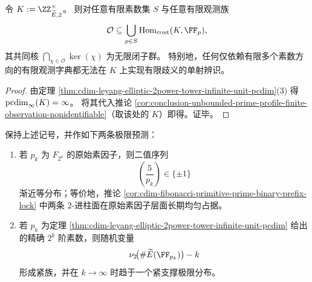 \begin{corollary}[二幂椭圆塔单位群在有限素数观测下不可辨识]\label{cor:cdim-elliptic-2power-tower-finite-prime-observation-indistinguishable}
令 \(K:=\ZZ_{\widetilde E,2}^{\times}\)。
则对任意有限素数集 \(S\) 与任意有限观测族
\[
\mathcal O\subseteq \bigcup_{p\in S}\mathrm{Hom}_{\mathrm{cont}}(K,\FF_p),
\]
其共同核 \(\bigcap_{\chi\in\mathcal O}\ker(\chi)\) 为无限闭子群。
特别地，任何仅依赖有限多个素数方向的有限观测字典都无法在 \(K\) 上实现有限歧义的单射辨识。
\end{corollary}
\begin{proof}
由定理 \ref{thm:cdim-leyang-elliptic-2power-tower-infinite-unit-pcdim}(3) 得 \(\operatorname{pcdim}_{\infty}(K)=\infty\)。
将其代入推论 \ref{cor:conclusion-unbounded-prime-profile-finite-observation-nonidentifiable}（取该处的 \(K\)）即得。证毕。
\end{proof}

\begin{conjecture}[符号与二幂阶的相干极限定律]\label{conj:cdim-fibonacci-elliptic-2adic-coherence-law}
保持上述记号，并作如下两条极限预测：
\begin{enumerate}
  \item 若 \(p_k\) 为 \(F_{2^k}\) 的原始素因子，则二值序列
  \[
  \left(\frac{5}{p_k}\right)\in\{\pm1\}
  \]
  渐近等分布；等价地，推论 \ref{cor:cdim-fibonacci-primitive-prime-binary-prefix-lock}
  中两条 \(2\)-进柱面在原始素因子层面长期均匀占据。
  \item 若 \(p_k\) 为定理 \ref{thm:cdim-leyang-elliptic-2power-tower-infinite-unit-pcdim}
  给出的精确 \(2^k\) 阶素数，则随机变量
  \[
  \nu_2\!\bigl(\#\widetilde E(\FF_{p_k})\bigr)-k
  \]
  形成紧族，并在 \(k\to\infty\) 时趋于一个紧支撑极限分布。
\end{enumerate}
\end{conjecture}

\endinput

